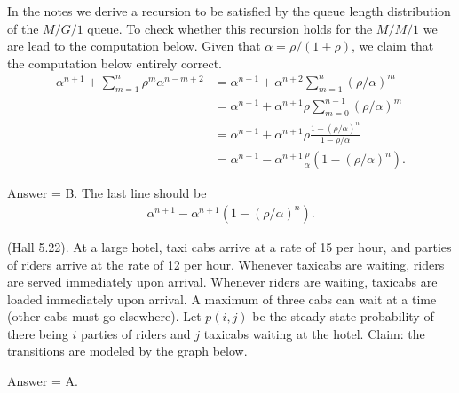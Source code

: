 \begin{exercise}[201807]
In the notes we derive a recursion to be satisfied by the queue length distribution of  the $M/G/1$ queue. To check whether this recursion holds for the $M/M/1$ we are lead to the computation below. 
Given that $\alpha = \rho/(1+\rho)$, we claim that the computation below entirely correct. 
\begin{align*}
\alpha^{n+1} + \sum_{m=1}^n \rho^m \alpha^{n-m+2}  
&= \alpha^{n+1} + \alpha^{n+2}\sum_{m=1}^n (\rho/\alpha)^m  \\
&= \alpha^{n+1} + \alpha^{n+1}\rho \sum_{m=0}^{n-1} (\rho/\alpha)^m \\
&= \alpha^{n+1} + \alpha^{n+1}\rho \frac{1-(\rho/\alpha)^n}{1-\rho/\alpha}\\
&= \alpha^{n+1} - \alpha^{n+1}\frac{\rho}{\alpha}(1-(\rho/\alpha)^n).
\end{align*}
\begin{solution}
Answer = B. The last line should be
\begin{align*}
\alpha^{n+1} - \alpha^{n+1}(1-(\rho/\alpha)^n).
\end{align*}
\end{solution}
\end{exercise}

\begin{exercise}[201807]
  (Hall 5.22). At a large hotel, taxi cabs arrive at a rate of 15 per
  hour, and parties of riders arrive at the rate of 12 per
  hour. Whenever taxicabs are waiting, riders are served immediately
  upon arrival. Whenever riders are waiting, taxicabs are loaded
  immediately upon arrival. A maximum of three cabs can wait at a time (other cabs must go elsewhere). Let $p(i,j)$ be the steady-state probability of there being $i$ parties of riders and $j$ taxicabs waiting at the hotel. Claim: the transitions are modeled by the graph below.

    \begin{center}

    \end{center}
\begin{solution}
Answer = A.
\end{solution}
\end{exercise}


